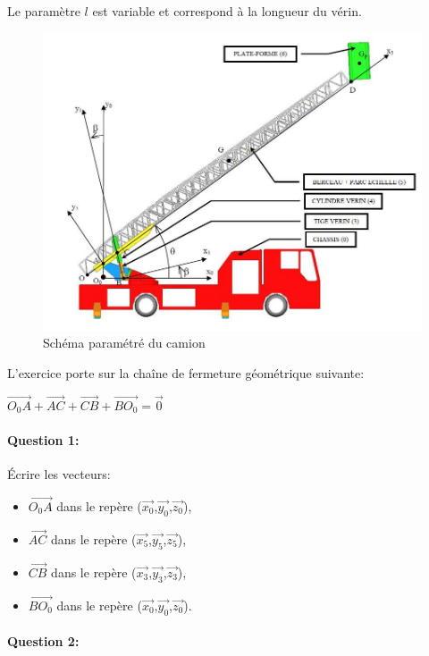 Le paramètre $l$ est variable et correspond à la longueur du vérin.

\begin{figure}[htbp]
\begin{center}
\includegraphics[width=0.6\linewidth]{img/camion.jpg}
\caption{Schéma paramétré du camion}
\label{fig:image2}
\end{center}
\end{figure}

L'exercice porte sur la chaîne de fermeture géométrique suivante:

$\overrightarrow{O_0A}+\overrightarrow{AC}+\overrightarrow{CB}+\overrightarrow{BO_0}=\overrightarrow{0}$

\paragraph{Question 1:}

Écrire les vecteurs:
\begin{itemize}
 \item $\overrightarrow{O_0A}$ dans le repère ($\overrightarrow{x_0}$,$\overrightarrow{y_0}$,$\overrightarrow{z_0}$),
 \item $\overrightarrow{AC}$ dans le repère ($\overrightarrow{x_5}$,$\overrightarrow{y_5}$,$\overrightarrow{z_5}$),
 \item $\overrightarrow{CB}$ dans le repère ($\overrightarrow{x_3}$,$\overrightarrow{y_3}$,$\overrightarrow{z_3}$),
 \item $\overrightarrow{BO_0}$ dans le repère ($\overrightarrow{x_0}$,$\overrightarrow{y_0}$,$\overrightarrow{z_0}$).
\end{itemize}

\paragraph{Question 2:}


